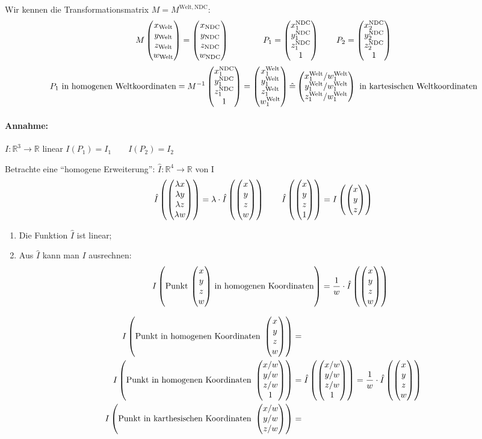 	\hrulefill

	Wir kennen die Transformationsmatrix $M = M^{\mathrm{Welt, NDC}}$:
	\[ M \begin{pmatrix}x_{\mathrm{Welt}}\\y_{\mathrm{Welt}}\\z_{\mathrm{Welt}}\\w_{\mathrm{Welt}}\end{pmatrix}
		= \begin{pmatrix}x_{\mathrm{NDC}}\\y_{\mathrm{NDC}}\\z_{\mathrm{NDC}}\\w_{\mathrm{NDC}}\end{pmatrix}
	\qquad\qquad P_1 = \begin{pmatrix}x_1^{\mathrm{NDC}}\\y_1^{\mathrm{NDC}}\\z_1^{\mathrm{NDC}}\\1\end{pmatrix}
	\qquad P_2 = \begin{pmatrix}x_2^{\mathrm{NDC}}\\y_2^{\mathrm{NDC}}\\z_2^{\mathrm{NDC}}\\1\end{pmatrix}\]
	\[P_1\text{ in homogenen Weltkoordinaten} = M^{-1} \begin{pmatrix}x_1^{\mathrm{NDC}}\\y_1^{\mathrm{NDC}}\\z_1^{\mathrm{NDC}}\\1\end{pmatrix}
	 = \begin{pmatrix}x_1^{\mathrm{Welt}}\\y_1^{\mathrm{Welt}}\\z_1^{\mathrm{Welt}}\\w_1^{\mathrm{Welt}}\end{pmatrix}
	 \hat = \begin{pmatrix}x_1^{\mathrm{Welt}}/w_1^{\mathrm{Welt}}\\y_1^{\mathrm{Welt}}/w_1^{\mathrm{Welt}}\\z_1^{\mathrm{Welt}}/w_1^{\mathrm{Welt}}\end{pmatrix}\text{ in kartesischen Weltkoordinaten}
	\]
\paragraph{Annahme:} $I: \mathbb{R}^3 \to \mathbb{R}$ linear $I(P_1) = I_1 \qquad I(P_2) = I_2$

\hrulefill

Betrachte eine "`homogene Erweiterung"': $\hat I: \mathbb{R}^4 \to \mathbb{R}$ von I
\[\hat I\left(\begin{pmatrix}\lambda x\\\lambda y\\\lambda z\\\lambda w\end{pmatrix}\right) =
	\lambda \cdot \hat I\left(\begin{pmatrix}x\\y\\z\\w\end{pmatrix}\right)
	\qquad
	\hat I\left(\begin{pmatrix}x\\y\\z\\1\end{pmatrix}\right) = I\left(\begin{pmatrix}x\\y\\z\end{pmatrix}\right)\]
\begin{enumerate}
 \item Die Funktion $\hat I$ ist linear;
 \item Aus $\hat I$ kann man $I$ ausrechnen:
	\[I\left(\text{Punkt $\begin{pmatrix}x\\y\\z\\w\end{pmatrix}$ in homogenen Koordinaten}\right) = \frac{1}{w} \cdot
		\hat I\left(\begin{pmatrix}x\\y\\z\\w\end{pmatrix}\right)\]
\end{enumerate}
\begin{align*}
 I\left(\text{Punkt in homogenen Koordinaten }\begin{pmatrix}x\\y\\z\\w\end{pmatrix}\right) &= \\
 I\left(\text{Punkt in homogenen Koordinaten }\begin{pmatrix}x/w\\y/w\\z/w\\1\end{pmatrix}\right) &=
	\hat I \left(\begin{pmatrix}x/w\\y/w\\z/w\\1\end{pmatrix}\right) = \frac{1}{w} \cdot \hat I\left(\begin{pmatrix}x\\y\\z\\w\end{pmatrix}\right)\\
 I\left(\text{Punkt in karthesischen Koordinaten }\begin{pmatrix}x/w\\y/w\\z/w\end{pmatrix}\right) &=
\end{align*}

